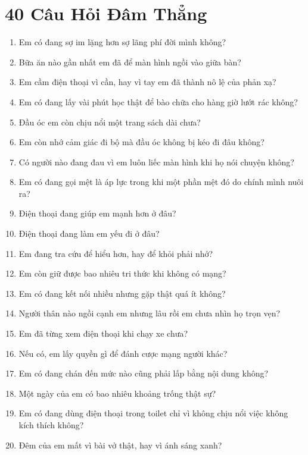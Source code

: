 \chapter*{40 Câu Hỏi Đâm Thẳng}

\begin{tcolorbox}[colback=bookbg,colframe=booksecondary,arc=4pt,boxrule=0.8pt,enhanced,breakable]
\begin{enumerate}[leftmargin=0.9cm]
\item Em có đang sợ im lặng hơn sợ lãng phí đời mình không?
\item Bữa ăn nào gần nhất em đã để màn hình ngồi vào giữa bàn?
\item Em cầm điện thoại vì cần, hay vì tay em đã thành nô lệ của phản xạ?
\item Em có đang lấy vài phút học thật để bào chữa cho hàng giờ lướt rác không?
\item Đầu óc em còn chịu nổi một trang sách dài chưa?
\item Em còn nhớ cảm giác đi bộ mà đầu óc không bị kéo đi đâu không?
\item Có người nào đang đau vì em luôn liếc màn hình khi họ nói chuyện không?
\item Em có đang gọi mệt là áp lực trong khi một phần mệt đó do chính mình nuôi ra?
\item Điện thoại đang giúp em mạnh hơn ở đâu?
\item Điện thoại đang làm em yếu đi ở đâu?
\item Em đang tra cứu để hiểu hơn, hay để khỏi phải nhớ?
\item Em còn giữ được bao nhiêu tri thức khi không có mạng?
\item Em có đang kết nối nhiều nhưng gặp thật quá ít không?
\item Người thân nào ngồi cạnh em nhưng lâu rồi em chưa nhìn họ trọn vẹn?
\item Em đã từng xem điện thoại khi chạy xe chưa?
\item Nếu có, em lấy quyền gì để đánh cược mạng người khác?
\item Em có đang chán đến mức nào cũng phải lấp bằng nội dung không?
\item Một ngày của em có bao nhiêu khoảng trống thật sự?
\item Em có đang dùng điện thoại trong toilet chỉ vì không chịu nổi việc không kích thích không?
\item Đêm của em mất vì bài vở thật, hay vì ánh sáng xanh?

\end{enumerate}
\end{tcolorbox}
